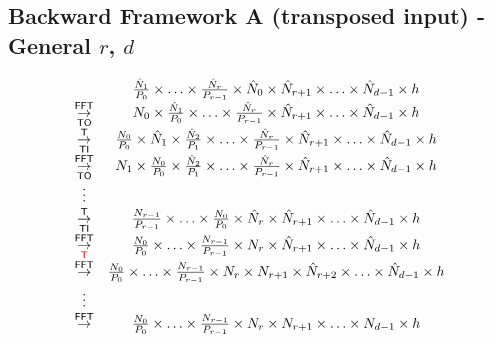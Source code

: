\newpage
\subsection{Backward Framework A (transposed input) - General \texorpdfstring{$r$, $d$}{r, d}}
\setlength{\arraycolsep}{2pt}
\begin{equation*}
  \begin{array}{cc}
    & \frac{\hat N_1}{P_0} \times \hdots \times \frac{\hat N_r}{P_{r-1}} \times \hat N_0 \times \hat N_{r+1} \times \hdots \times \hat N_{d-1} \times h \\
    \overset{\textsf{FFT}}{\underset{\textsf{TO}}{\rightarrow}} & N_0 \times \frac{\hat N_1}{P_0} \times \hdots \times \frac{\hat N_r}{P_{r-1}} \times \hat N_{r+1} \times \hdots \times \hat N_{d-1} \times h \\
    \overset{\textsf{T}}{\underset{\textsf{TI}}{\rightarrow}} & \frac{N_0}{P_0} \times \hat N_1 \times \frac{\hat N_2}{P_1} \times \hdots \times \frac{\hat N_r}{P_{r-1}} \times \hat N_{r+1} \times \hdots \times \hat N_{d-1} \times h \\
    \overset{\textsf{FFT}}{\underset{\textsf{TO}}{\rightarrow}} & N_1 \times \frac{N_0}{P_0} \times \frac{\hat N_2}{P_1} \times \hdots \times \frac{\hat N_r}{P_{r-1}} \times \hat N_{r+1} \times \hdots \times \hat N_{d-1} \times h \\
    \vdots & \\
    \overset{\textsf{T}}{\underset{\textsf{TI}}{\rightarrow}} & \frac{N_{r-1}}{P_{r-1}} \times \hdots \times \frac{N_0}{P_0} \times \hat N_r \times \hat N_{r+1} \times \hdots \times \hat N_{d-1} \times h \\
    \overset{\textsf{FFT}}{\underset{\textsf{\textcolor{red}{T}}}{\rightarrow}} & \frac{N_0}{P_0} \times \hdots \times \frac{N_{r-1}}{P_{r-1}} \times N_r \times \hat N_{r+1} \times \hdots \times \hat N_{d-1} \times h \\
    \overset{\textsf{FFT}}{\underset{\textsf{}}{\rightarrow}} & \frac{N_0}{P_0} \times \hdots \times \frac{N_{r-1}}{P_{r-1}} \times N_r \times N_{r+1} \times \hat N_{r+2} \times \hdots \times \hat N_{d-1} \times h \\
    \vdots & \\
    \overset{\textsf{FFT}}{\underset{\textsf{}}{\rightarrow}} & \frac{N_0}{P_0} \times \hdots \times \frac{N_{r-1}}{P_{r-1}} \times N_r \times N_{r+1} \times \hdots \times N_{d-1} \times h \\
  \end{array}
\end{equation*}

\newpage
